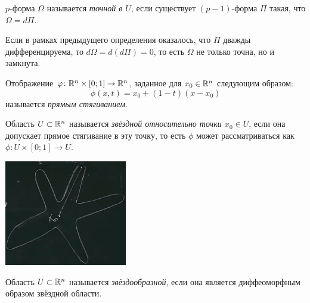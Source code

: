 \begin{definition}
	$p$-форма $\Omega$ называется \textit{точной в $U$}, если существует $(p - 1)$-форма $\Pi$ такая, что $\Omega = d\Pi$.
\end{definition}

\begin{note}
	Если в рамках предыдущего определения оказалось, что $\Pi$ дважды дифференцируема, то $d\Omega = d(d\Pi) = 0$, то есть $\Omega$ не только точна, но и замкнута.
\end{note}

\begin{definition}
	Отображение $\varphi \colon \mathbb{R}^n \times [0; 1] \to \mathbb{R}^n$, заданное для $x_0 \in \mathbb{R}^n$ следующим образом:
	\[
		\phi(x, t) = x_0 + (1 - t)(x - x_0)
	\]
	называется \textit{прямым стягиванием}.
\end{definition}

\begin{definition}
	Область $U \subset \mathbb{R}^n$ называется \textit{звёздной относительно точки $x_0 \in U$}, если она допускает прямое стягивание в эту точку, то есть $\phi$ может рассматриваться как $\phi \colon U \times [0; 1] \to U$.
\end{definition}

\begin{center}
	\includegraphics[width=0.4\textwidth]{images/star.png}
\end{center}

\begin{definition}
	Область $U \subset \mathbb{R}^n$ называется \textit{звёздообразной}, если она является диффеоморфным образом звёздной области.
\end{definition}

